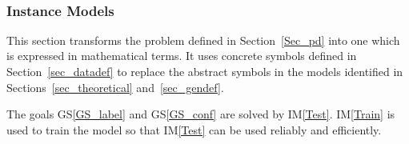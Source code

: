 \documentclass[12pt]{article}
\newcommand{\gsref}[1]{GS\ref{#1}}
\newcommand{\iref}[1]{IM\ref{#1}}
\begin{document}
~\newline
\subsubsection{Instance Models} \label{sec_instance}    

This section transforms the problem defined in Section~\ref{Sec_pd} into 
one which is expressed in mathematical terms. It uses concrete symbols defined 
in Section~\ref{sec_datadef} to replace the abstract symbols in the models 
identified in Sections~\ref{sec_theoretical} and~\ref{sec_gendef}.

The goals \gsref{GS_label} and \gsref{GS_conf} are solved by \iref{Test}. \iref{Train} is used 
to train the model so that \iref{Test} can be used reliably and efficiently.

~\newline

\end{document}
